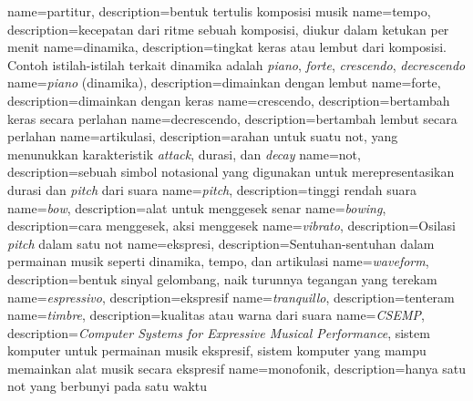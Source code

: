 {
    name=partitur,
    description={bentuk tertulis komposisi musik}
}
{
    name=tempo,
    description={kecepatan dari ritme sebuah komposisi, diukur dalam ketukan per menit}
}
{
	name=dinamika,
	description={tingkat keras atau lembut dari komposisi. Contoh istilah-istilah terkait dinamika adalah \textit{piano}, \textit{forte}, \textit{crescendo}, \textit{decrescendo}}
}
{
	name={\textit{piano} (dinamika)},
	description={dimainkan dengan lembut}
}
{
	name={forte},
	description={dimainkan dengan keras}
}
{
	name=crescendo,
	description={bertambah keras secara perlahan}
}
{
	name=decrescendo,
	description={bertambah lembut secara perlahan}
}
{
	name=artikulasi,
	description={arahan untuk suatu not, yang menunukkan karakteristik \textit{attack}, durasi, dan \textit{decay}}
}
{
	name=not,
	description={sebuah simbol notasional yang digunakan untuk merepresentasikan durasi dan \textit{pitch} dari suara}
}
{
	name=\textit{pitch},
	description={tinggi rendah suara}
}
{
	name=\textit{bow},
	description={alat untuk menggesek senar}
}
{
	name=\textit{bowing},
	description={cara menggesek, aksi menggesek}
}
{
	name=\textit{vibrato},
	description={Osilasi \textit{pitch} dalam satu not}
}
{
	name=ekspresi,
	description={Sentuhan-sentuhan dalam permainan musik seperti dinamika, tempo, dan artikulasi}
}
{
	name=\textit{waveform},
	description={bentuk sinyal gelombang, naik turunnya tegangan yang terekam}
}
{
	name=\textit{espressivo},
	description={ekspresif}
}
{
	name=\textit{tranquillo},
	description={tenteram}
}
{
	name=\textit{timbre},
	description={kualitas atau warna dari suara}
}
{
	name=\textit{CSEMP},
	description={\textit{Computer Systems for Expressive Musical Performance}, sistem komputer untuk permainan musik ekspresif, sistem komputer yang mampu memainkan alat musik secara ekspresif}
}
{
	name=monofonik,
	description={hanya satu not yang berbunyi pada satu waktu}
}